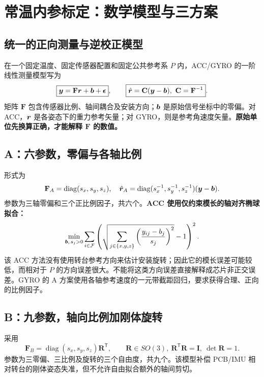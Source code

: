 \chapter{常温内参标定：数学模型与三方案}
\section{统一的正向测量与逆校正模型}
在一个固定温度、固定传感器配置和固定公共参考系 $P$ 内，ACC/GYRO 的一阶线性测量模型写为
\begin{equation}\label{eq:forward}
\boxed{\bm{y}=\mathbf F\bm{r}+\bm{b}+\bm{\epsilon}},\qquad
\boxed{\hat{\bm{r}}=\mathbf C(\bm{y}-\bm{b}),\ \mathbf C=\mathbf F^{-1}}.
\end{equation}
矩阵 $\mathbf F$ 包含传感器比例、轴间耦合及安装方向；$\bm{b}$ 是原始信号坐标中的零偏。对 ACC，$\bm{r}$ 是各姿态下的重力参考矢量；对 GYRO，则是参考角速度矢量。\textbf{原始单位先换算正确，才能解释 $\mathbf F$ 的数值。}

\section{A：六参数，零偏与各轴比例}
形式为
\begin{equation}
\mathbf F_A=\operatorname{diag}(s_x,s_y,s_z),\quad
\hat{\bm{r}}_A=\operatorname{diag}(s_x^{-1},s_y^{-1},s_z^{-1})(\bm{y}-\bm{b}).
\end{equation}
参数为三轴零偏和三个正比例因子，共六个。\textbf{ACC 使用仅约束模长的轴对齐椭球拟合：}
\begin{equation}
\min_{\bm{b},\,s_j>0}\sum_{i\in\mathcal F}
\left(\sqrt{\sum_{j\in\{x,y,z\}}\left(\frac{y_{ij}-b_j}{s_j}\right)^2}-1\right)^2.
\end{equation}
该 ACC 方法没有使用转台参考方向来估计安装旋转；因此它的模长误差可能较低，而相对于 $P$ 的方向误差很大。不能将这类方向误差直接解释成芯片非正交误差。GYRO 的 A 方案使用各轴参考速度的一元带截距回归，要求获得合理、正向的比例因子。

\section{B：九参数，轴向比例加刚体旋转}
采用
\begin{equation}
\mathbf F_B=\operatorname{diag}(s_x,s_y,s_z)\mathbf R^\mathsf T,
\qquad \mathbf R\in SO(3),\ \mathbf R^\mathsf T\mathbf R=\mathbf I,\ \det\mathbf R=1.
\end{equation}
参数为三零偏、三比例及旋转的三个自由度，共九个。该模型补偿 PCB/IMU 相对转台的刚体姿态失准，但不允许自由拟合额外的轴间剪切。

